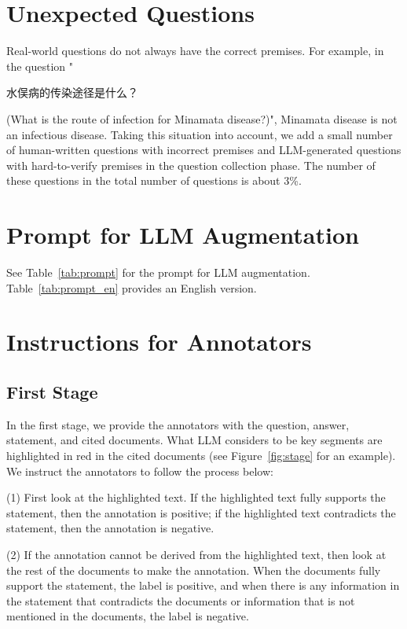 

\section{Unexpected Questions}
\label{app:question}
Real-world questions do not always have the correct premises. For example, in the question "\begin{CJK}{UTF8}{gbsn}水俣病的传染途径是什么？\end{CJK}(What is the route of infection for Minamata disease?)", Minamata disease is not an infectious disease. Taking this situation into account, we add a small number of human-written questions with incorrect premises and LLM-generated questions with hard-to-verify premises in the question collection phase. The number of these questions in the total number of questions is about 3\%.

\section{Prompt for LLM Augmentation}
\label{app:aug}


See Table~\ref{tab:prompt} for the prompt for LLM augmentation. Table~\ref{tab:prompt_en} provides an English version.

\section{Instructions for Annotators}
\label{app:ann}
\subsection{First Stage}
In the first stage, we provide the annotators with the question, answer, statement, and cited documents. What LLM considers to be key segments are highlighted in red in the cited documents (see Figure~\ref{fig:stage} for an example). We instruct the annotators to follow the process below:

\par (1) First look at the highlighted text. If the highlighted text fully supports the statement, then the annotation is positive; if the highlighted text contradicts the statement, then the annotation is negative.

\par (2) If the annotation cannot be derived from the highlighted text, then look at the rest of the documents to make the annotation. When the documents fully support the statement, the label is positive, and when there is any information in the statement that contradicts the documents or information that is not mentioned in the documents, the label is negative.

